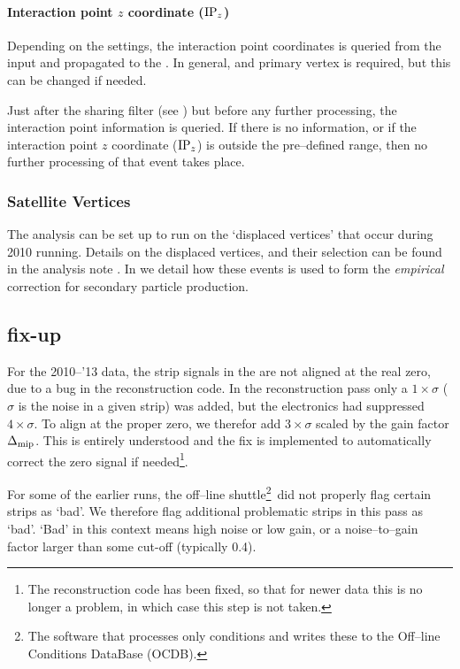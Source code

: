 \paragraph{Interaction point $z$ coordinate ($\IPz$)} 
Depending on the settings, the interaction point coordinates is
queried from the input \ESD{} and propagated to the \AOD{}.  In
general, and \SPD{} primary vertex is required, but this can be
changed if needed. 

Just after the sharing filter (see )
but before any further processing, the interaction point information
is queried.  If there is no information, or if the interaction point
$z$ coordinate ($\IPz$) is outside the pre--defined range, then no
further processing of that event takes place.

\subsubsection{Satellite Vertices}
\label{sec:sub:sub:dispvtx}

The analysis can be set up to run on the `displaced vertices' that
occur during \LHC{} 2010 \PbPbCol{} running. Details on the displaced
vertices, and their selection can be found in the \VZERO{} analysis note
\cite{maxime}. In  we detail how these
events is used to form the \emph{empirical} correction for secondary
particle production.

\subsection{\ESD{} fix-up}
\label{sec:sub:fixer} 

For the 2010--'13 data, the \FMD{} strip signals in the \ESD{} are not
aligned at the real zero, due to a bug in the reconstruction code.  In
the reconstruction pass only a $1\times\sigma$ ($\sigma$ is the noise
in a given strip) was added, but the electronics had suppressed
$4\times\sigma$.  To align at the proper zero, we therefor add
$3\times\sigma$ scaled by the gain factor $\Delta_{\text{mip}}$.  This is
entirely understood and the fix is implemented to automatically
correct the zero signal if needed\footnote{The reconstruction code has
  been fixed, so that for newer data this is no longer a problem, in
  which case this step is not taken.}. 

For some of the earlier runs, the off--line shuttle\footnote{The
  software that processes only conditions and writes these to the
  Off--line Conditions DataBase (OCDB).}\ did not properly flag certain
strips as `bad'.  We therefore flag additional problematic strips in
this pass as `bad'.  `Bad' in this context means high noise or low
gain, or a noise--to--gain factor larger than some cut-off (typically
0.4). 


